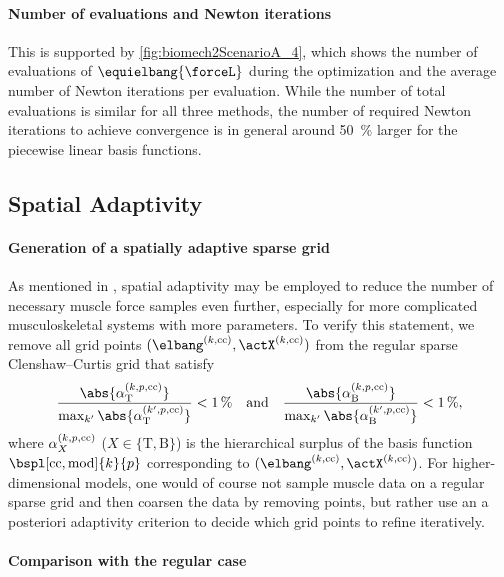 \paragraph{Number of evaluations and Newton iterations}

This is supported by \cref{fig:biomech2ScenarioA_4},
which shows the number of evaluations of $\equielbang{\forceL}$
during the optimization and the average number of Newton iterations
per evaluation.
While the number of total evaluations is similar for all three methods,
the number of required Newton iterations to achieve convergence
is in general around \SI{50}{\percent} larger for the piecewise linear
basis functions.



\subsection{Spatial Adaptivity}
\label{sec:735adaptivity}

\paragraph{Generation of a spatially adaptive sparse grid}

As mentioned in \cite{Valentin18Gradient}, spatial adaptivity
may be employed to reduce the number of necessary muscle force samples
even further,
especially for more complicated musculoskeletal systems with
more parameters.
To verify this statement, we remove all grid points
$(\elbang^{(k,\cc)}, \actX^{(k,\cc)})$
from the regular sparse Clenshaw--Curtis grid that satisfy
\begin{equation}
  \frac{
    \abs{\alpha_\mathrm{T}^{(k,p,\cc)}}
  }{
    \max_{k'} \abs{\alpha_\mathrm{T}^{(k',p,\cc)}}
  } < \SI{1}{\percent}
  \quad\text{and}\quad
  \frac{
    \abs{\alpha_\mathrm{B}^{(k,p,\cc)}}
  }{
    \max_{k'} \abs{\alpha_\mathrm{B}^{(k',p,\cc)}}
  } < \SI{1}{\percent},
\end{equation}
where $\alpha_X^{(k,p,\mathrm{cc})}$ ($X \in \{\mathrm{T}, \mathrm{B}\}$)
is the hierarchical surplus of the basis function $\bspl[\cc,\modified]{k}{p}$
corresponding to $(\elbang^{(k,\cc)}, \actX^{(k,\cc)})$.
For higher-dimensional models,
one would of course not sample muscle data on a regular sparse grid
and then coarsen the data by removing points,
but rather use an a posteriori adaptivity criterion to
decide which grid points to refine iteratively.

\paragraph{Comparison with the regular case}

